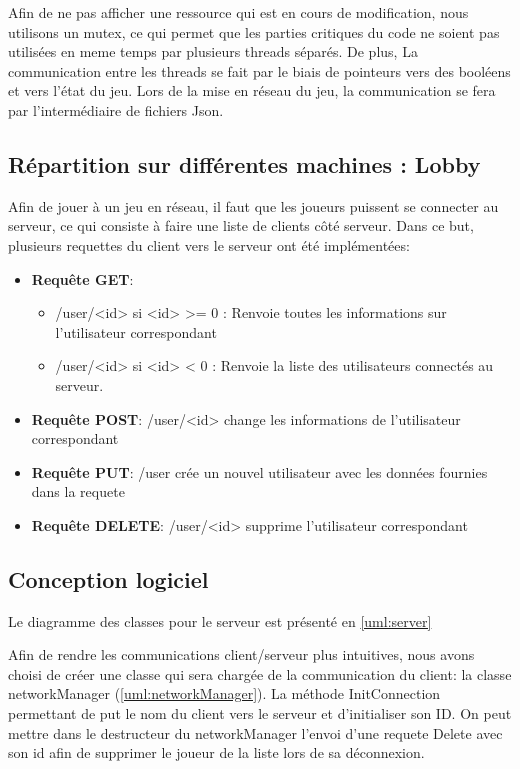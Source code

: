 Afin de ne pas afficher une ressource qui est en cours de modification, nous utilisons un mutex, ce qui permet que les parties critiques du code ne soient pas utilisées en meme temps par plusieurs threads séparés. De plus, La communication entre les threads se fait par le biais de pointeurs vers des booléens et vers l'état du jeu. Lors de la mise en réseau du jeu, la communication se fera par l'intermédiaire de fichiers Json.

\subsection{Répartition sur différentes machines : Lobby}
Afin de jouer à un jeu en réseau, il faut que les joueurs puissent se connecter au serveur, ce qui consiste à faire une liste de clients c\^oté serveur. Dans ce but, plusieurs requettes du client vers le serveur ont été implémentées:
\begin{itemize}
    \item \textbf{Requ\^ete GET}:
    \begin{itemize}
        \item /user/<id> si <id> >= 0 : Renvoie toutes les informations sur l'utilisateur correspondant
        \item /user/<id> si <id> < 0 : Renvoie la liste des utilisateurs connectés au serveur.
    \end{itemize}
    \item \textbf{Requ\^ete POST}: /user/<id> change les informations de l'utilisateur correspondant
    \item \textbf{Requ\^ete PUT}: /user crée un nouvel utilisateur avec les données fournies dans la requete
    \item \textbf{Requ\^ete DELETE}: /user/<id> supprime l'utilisateur correspondant
\end{itemize}

\clearpage
\subsection{Conception logiciel}
Le diagramme des classes pour le serveur est présenté en \autoref{uml:server}

Afin de rendre les communications client/serveur plus intuitives, nous avons choisi de créer une classe qui sera chargée de la communication du client: la classe networkManager (\autoref{uml:networkManager}). La méthode InitConnection permettant de put le nom du client vers le serveur et d'initialiser son ID. On peut mettre dans le destructeur du networkManager l'envoi d'une requete Delete avec son id afin de supprimer le joueur de la liste lors de sa déconnexion.

